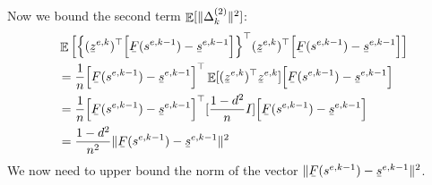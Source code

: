 \documentclass[11pt]{article}
\theoremstyle{plain}
\DeclarePairedDelimiter{\norm}{\lVert}{\rVert}
\DeclareMathOperator*{\E}{\mathbb{E}}
\theoremstyle{plain}
\theoremstyle{definition}
\newcommand\barbelow[1]{\stackunder[1.2pt]{$#1$}{\rule{.8ex}{.075ex}}}
\begin{document}
Now we bound the second term $\E[\norm{\Delta_k^{(2)}}^2] $:
\begin{equation}
\begin{split}
& \E \Big[\Big\{ (\barbelow{z}^{e,k})^\top \Big[ \barbelow{F}(s^{e,k-1}) - \barbelow{s}^{e,k-1} \Big] \Big\}^\top (\barbelow{z}^{e,k})^\top \Big[ \barbelow{F}(s^{e,k-1}) - \barbelow{s}^{e,k-1} \Big] \Big] \\
& = \frac{1}{n} \Big[ \barbelow{F}(s^{e,k-1}) - \barbelow{s}^{e,k-1} \Big]^\top \E[(\barbelow{z}^{e,k})^\top \barbelow{z}^{e,k}]  \Big[ \barbelow{F}(s^{e,k-1}) - \barbelow{s}^{e,k-1} \Big] \\
& = \frac{1}{n} \Big[ \barbelow{F}(s^{e,k-1}) - \barbelow{s}^{e,k-1} \Big]^\top [\frac{1 - d^2}{n} I]  \Big[ \barbelow{F}(s^{e,k-1}) - \barbelow{s}^{e,k-1} \Big] \\
& =  \frac{1-d^2}{n^2} \norm{ \barbelow{F}(s^{e,k-1}) - \barbelow{s}^{e,k-1}}^2
\end{split}
\end{equation}
We now need to upper bound the norm of the vector $\norm{ \barbelow{F}(s^{e,k-1}) - \barbelow{s}^{e,k-1}}^2$.
\end{document}
